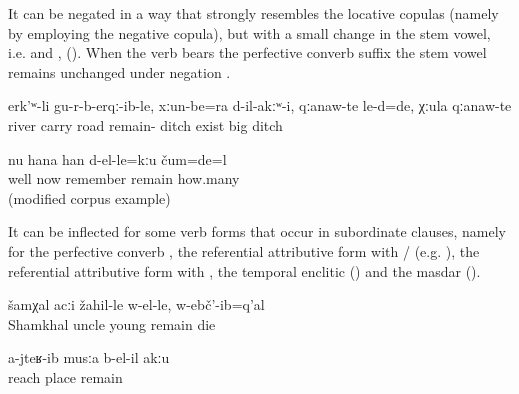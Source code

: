 It can be negated in a way that strongly resembles the locative copulas (namely by employing the negative copula), but with a small change in the stem vowel, i.e.  and  , (). When the verb  bears the perfective converb suffix  the stem vowel remains unchanged under negation .
%
\begin{exe}
	\ex	\label{ex:The river carried them away, roads had not remained, and big ditches were there}
	\gll	erk'ʷ-li	gu-r-b-erqː-ib-le,	xːun-be=ra	d-il-akːʷ-i,	qːanaw-te	le-d=de,		χːula	qːanaw-te\\
		river	carry	road	remain-		ditch	exist		big	ditch\\
	\glt	{}

	\ex	\label{ex:Now I don't remember how many (rubles) it was. (modified example)}
	\gll	nu	hana	han	d-el-le=kːu	čum=de=l\\
		well	now	remember	remain	how.many\\
	\glt	{} (modified corpus example)
\end{exe}

It can be inflected for some verb forms that occur in subordinate clauses, namely for the perfective converb , the referential attributive form with \slash{} (e.g. ), the referential attributive form with  , the temporal enclitic  () and the masdar ().
%
\begin{exe}
	\ex	\label{ex:Uncle Shamkhal died when he was young}
	\gll	šamχal	acːi	žahil-le	w-el-le,	w-ebč'-ib=q'al\\
		Shamkhal	uncle	young	remain	die\\
	\glt	{}

	\ex	\label{ex:No place is left where I (masc.) did not go}
	\gll	a-jteʁ-ib	musːa	b-el-il	akːu\\
		reach	place	remain	\\
	\glt	{}
\end{exe}

